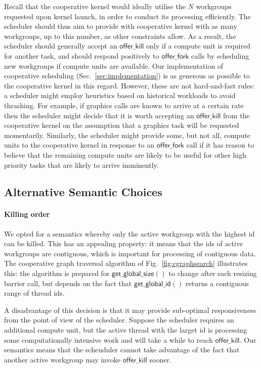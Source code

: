 \documentclass[numbers,nocopyrightspace,10pt]{sigplanconf}
\newcommand{\myfig}{Fig.~}
\newcommand{\mysec}{Sec.~}
\newcommand{\offerfork}{\mathsf{offer\_fork}}
\newcommand{\offerkill}{\mathsf{offer\_kill}}
\newcommand{\getglobalid}{\mathsf{get\_global\_id}}
\newcommand{\getglobalsize}{\mathsf{get\_global\_size}}
\begin{document}
Recall that the cooperative kernel would ideally utilise the $N$
workgroups requested upon kernel launch, in order to conduct its
processing efficiently.  The scheduler should thus aim to provide with
cooperative kernel with as many workgroups, up to this number, as
other constraints allow.  As a result, the scheduler should generally
accept an $\offerkill$ only if a compute unit is required for another
task, and should respond positively to $\offerfork$ calls by
scheduling new workgroups if compute units are available.  Our
implementation of cooperative scheduling (\mysec\ref{sec:implementation}) is as
generous as possible to the cooperative kernel in this regard.
However, these are not hard-and-fast rules: a scheduler might employ
heuristics based on historical workloads to avoid thrashing.  For
example, if graphics calls are known to arrive at a certain rate then
the scheduler might decide that it is worth accepting an $\offerkill$
from the cooperative kernel on the assumption that a graphics task
will be requested momentarily.  Similarly, the scheduler might provide
some, but not all, compute units to the cooperative kernel in response
to an $\offerfork$ call if it has reason to believe that the remaining
compute units are likely to be useful for other high priority tasks
that are likely to arrive imminently.


\subsection{Alternative Semantic Choices}\label{sec:semanticalternatives}

\paragraph{Killing order}

We opted for a semantics whereby only the active workgroup with the
highest id can be killed.  This has an appealing property: it means
that the ids of active workgroups are contiguous, which is important
for processing of contiguous data.  The cooperative graph traversal
algorithm of \myfig\ref{fig:cgraphsearch} illustrates this: the algorithm is prepared
for $\getglobalsize()$ to change after each resizing barrier call, but
depends on the fact that $\getglobalid()$ returns a contiguous range
of thread ids.

A disadvantage of this decision is that it may provide sub-optimal
responsiveness from the point of view of the scheduler.  Suppose the
scheduler requires an additional compute unit, but the active thread
with the larget id is processing some computationally intensive work
and will take a while to reach $\offerkill$.  Our semantics means that
the scheuduler cannot take advantage of the fact that another active
workgroup may invoke $\offerkill$ sooner.
\end{document}
